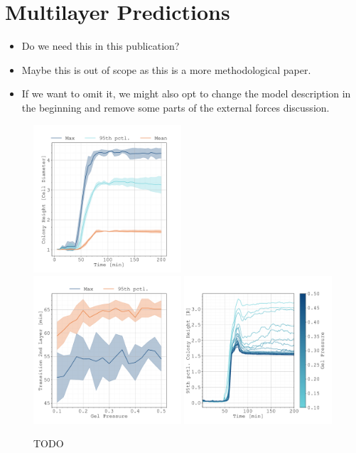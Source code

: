 \documentclass{article}
\begin{document}
\section{Multilayer Predictions}
\begin{itemize}
    \item Do we need this in this publication?
    \item Maybe this is out of scope as this is a more methodological paper.
    \item If we want to omit it, we might also opt to change the model description in the beginning
        and remove some parts of the external forces discussion.
\end{itemize}

\begin{figure}[H]
    \centering
    \includegraphics[width=0.49\textwidth]
        {docs/source/_static/scripts/crm_multilayer/multilayer-time-evolution.pdf}\\
    \includegraphics[width=0.49\textwidth]
        {docs/source/_static/scripts/crm_multilayer/colony-height-vs-gel_pressure.pdf}
    \includegraphics[width=0.49\textwidth]
        {docs/source/_static/scripts/crm_multilayer/colony-height-vs-time.pdf}
    \caption{TODO}
    \label{fig:multilayer}
\end{figure}
\end{document}

